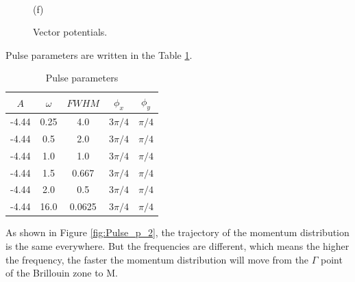 \begin{figure}[h!]
\begin{minipage}[h]{0.5\linewidth}
\end{minipage}
\hfill
\begin{minipage}[h]{0.5\linewidth}
 \\(f)
\end{minipage}
\caption{Vector potentials.}
\label{fig:Pulses_2}
\end{figure}

Pulse parameters are written in the Table \ref{table:2}. 

\begin{table}[h!]
\begin{center}
  \begin{tabular}{ | c | c | c | c | c |}
    \hline
    $A$ & $\omega$ & $FWHM$ & $\phi_x$ & $\phi_y$ \\ \hline
    -4.44 & 0.25 & 4.0 & $3\pi /4$ & $\pi /4$  \\ \hline
    -4.44 & 0.5 & 2.0 & $3\pi /4$ & $\pi /4$   \\ \hline
    -4.44 & 1.0 & 1.0 & $3\pi /4$ & $\pi /4$   \\ \hline
    -4.44 & 1.5 & 0.667 & $3\pi /4$ & $\pi /4$   \\ \hline
    -4.44 & 2.0 & 0.5 & $3\pi /4$ & $\pi /4$   \\ \hline
    -4.44 & 16.0 & 0.0625 & $3\pi /4$ & $\pi /4$   \\ 

    \hline
  \end{tabular}
\caption{Pulse parameters}
\label{table:2}
\end{center}
\end{table}

As shown in Figure \ref{fig:Pulse_p_2}, the trajectory of the momentum distribution is the same everywhere. But the frequencies are different, which means the higher the frequency, the faster the momentum distribution will move from the $\Gamma$ point of the Brillouin zone to M. 

